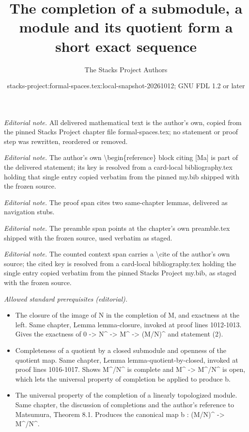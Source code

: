 \documentclass{stacks-project}
\title{The completion of a submodule, a module and its quotient form a short exact sequence}
\author{The Stacks Project Authors}
\date{stacks-project:formal-spaces.tex:local-snapshot-20261012; GNU FDL 1.2 or later}
\theoremstyle{plain}
\theoremstyle{definition}
\theoremstyle{remark}
\numberwithin{equation}{subsection}
\begin{document}
\maketitle
\noindent\textit{Editorial note.} All delivered mathematical text is the author's own, copied from the pinned Stacks Project chapter file formal-spaces.tex; no statement or proof step was rewritten, reordered or removed.\par\medskip
\noindent\textit{Editorial note.} The author's own \textbackslash{}begin\{reference\} block citing [Ma] is part of the delivered statement; its key is resolved from a card-local bibliography.tex holding that single entry copied verbatim from the pinned my.bib shipped with the frozen source.\par\medskip
\noindent\textit{Editorial note.} The proof span cites two same-chapter lemmas, delivered as navigation stubs.\par\medskip
\noindent\textit{Editorial note.} The preamble span points at the chapter's own preamble.tex shipped with the frozen source, used verbatim as staged.\par\medskip
\noindent\textit{Editorial note.} The counted context span carries a \textbackslash{}cite of the author's own source; the cited key is resolved from a card-local bibliography.tex holding the single entry copied verbatim from the pinned Stacks Project my.bib, as staged with the frozen source.\par\medskip
\noindent\textit{Allowed standard prerequisites (editorial).}\begin{itemize}
\item The closure of the image of N in the completion of M, and exactness at the left. Same chapter, Lemma lemma-closure, invoked at proof lines 1012-1013. Gives the exactness of 0 -> N\textasciicircum{} -> M\textasciicircum{} -> (M/N)\textasciicircum{} and statement (2).
\item Completeness of a quotient by a closed submodule and openness of the quotient map. Same chapter, Lemma lemma-quotient-by-closed, invoked at proof lines 1016-1017. Shows M\textasciicircum{}/N\textasciicircum{} is complete and M\textasciicircum{} -> M\textasciicircum{}/N\textasciicircum{} is open, which lets the universal property of completion be applied to produce b.
\item The universal property of the completion of a linearly topologized module. Same chapter, the discussion of completions and the author's reference to Matsumura, Theorem 8.1. Produces the canonical map b : (M/N)\textasciicircum{} -> M\textasciicircum{}/N\textasciicircum{}.
\end{itemize}\medskip
\end{document}
